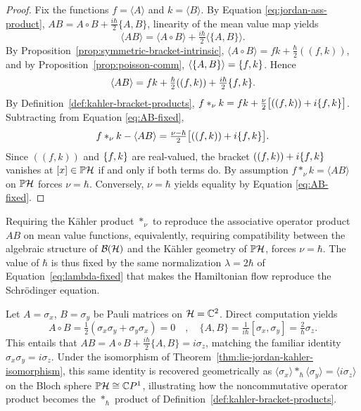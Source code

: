 \begin{proof}
	Fix the functions $f = \langle A\rangle $ and $k = \langle B\rangle $. By Equation \eqref{eq:jordan-ass-product}, $AB=A\circ B+\tfrac{i\hbar}{2}\{A,B\}$,  linearity of the mean value map yields
	\[
	\langle AB\rangle=\langle A\circ B\rangle+\tfrac{i\hbar}{2}\langle\{A,B\}\rangle.
	\]
	By Proposition~\ref{prop:symmetric-bracket-intrinsic},
	$\langle A\circ B\rangle=fk+\tfrac{\hbar}{2}((f,k))$, and by
	Proposition~\ref{prop:poisson-comm}, $\langle\{A,B\}\rangle=\{f,k\}$.
	Hence
	\begin{equation}
		\langle AB\rangle=fk+\tfrac{\hbar}{2}((f,k))+\tfrac{i\hbar}{2}\{f,k\}.
		\label{eq:AB-fixed}
	\end{equation}
	By Definition~\ref{def:kahler-bracket-products},
	$f*_{\nu} k=fk+\tfrac{\nu}{2}\big[((f,k))+i\{f,k\}\big]$. Subtracting
	from Equation \eqref{eq:AB-fixed},
	\[
	f*_{\nu} k-\langle AB\rangle=\tfrac{\nu-\hbar}{2}\big[((f,k))+i\{f,k\}\big].
	\]
	Since $((f,k))$ and $\{f,k\}$ are real-valued, the bracket
	$((f,k))+i\{f,k\}$ vanishes at $[x]\in\PH$ if and only if both terms do. By assumption $f*_{\nu} k=\langle AB\rangle$ on $\PH$ forces $\nu=\hbar$. Conversely, $\nu=\hbar$ yields equality by Equation \eqref{eq:AB-fixed}.
\end{proof}

Requiring the Kähler product $*_{\nu}$ to reproduce the associative operator product $AB$ on mean value functions, equivalently, requiring compatibility between the algebraic structure of $\BH$ and the Kähler geometry of $\PH$, forces $\nu=\hbar$. The value of $\hbar$ is thus fixed by the same normalization $\lambda=2\hbar$ of Equation~\eqref{eq:lambda-fixed} that makes the Hamiltonian flow reproduce the Schrödinger equation.

\begin{example}
	Let $A=\sigma_x$, $B=\sigma_y$ be Pauli matrices on $\H=\C^2$. Direct
	computation yields $$A\circ B=\tfrac12(\sigma_x\sigma_y+\sigma_y\sigma_x)=0 \quad , \quad \{A,B\}=\tfrac{1}{i\hbar}[\sigma_x,\sigma_y]=\tfrac{2}{\hbar}\sigma_z.$$
	This entails that $AB=A\circ B+\tfrac{i\hbar}{2}\{A,B\}=i\sigma_z$, matching the
	familiar identity $\sigma_x\sigma_y=i\sigma_z$. Under the isomorphism
	of Theorem~\ref{thm:lie-jordan-kahler-isomorphism}, this same identity
	is recovered  geometrically as
	$\langle\sigma_x\rangle *_{\hbar}\langle\sigma_y\rangle=\langle
	i\sigma_z\rangle$ on the Bloch sphere $\PH\cong\C P^1$, illustrating
	how the noncommutative operator product becomes the $*_{\hbar}$ product
	of Definition~\ref{def:kahler-bracket-products}.
\end{example}

